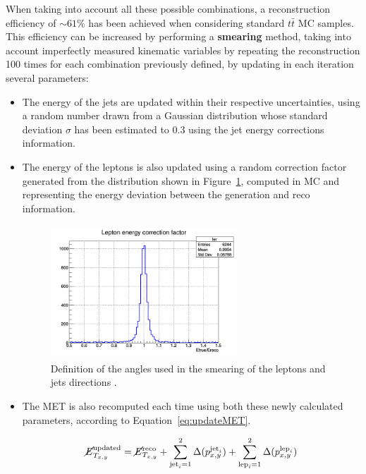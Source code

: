 \documentclass[a4paper, 10pt, openright]{report}
\begin{document}
When taking into account all these possible combinations, a reconstruction efficiency of $\sim 61$\% has been achieved when considering standard $t \bar t$ \ac{MC} samples. This efficiency can be increased by performing a \textbf{smearing} method, taking into account imperfectly measured kinematic variables by repeating the reconstruction 100 times for each combination previously defined, by updating in each iteration several parameters:
\begin{itemize}
\item The energy of the jets are updated within their respective uncertainties, using a random number drawn from a Gaussian distribution whose standard deviation $\sigma$ has been estimated to 0.3 using the jet energy corrections information.

\item The energy of the leptons is also updated using a random correction factor generated from the distribution shown in Figure~\ref{fig:lepsmearing}, computed in \ac{MC} and representing the energy deviation between the generation and reco information.

\begin{figure}[htbp]
\centering
\includegraphics[width=7cm, height=5cm]{figs/ler.png}
\caption{Definition of the angles used in the smearing of the leptons and jets directions \cite{DESYAN}.}
\label{fig:lepsmearing}
\end{figure}

\item The \ac{MET} is also recomputed each time using both these newly calculated parameters, according to Equation~\ref{eq:updateMET}.

\begin{equation}
\label{eq:updateMET}
\cancel{E}_{T_{x,y}}^{\text{updated}} = \cancel{E}_{T_{x,y}}^{\text{reco}} + \sum_{\text{jet}_i = 1}^{2} \Delta(p_{x,y}^{\text{jet}_i}) + \sum_{\text{lep}_i = 1}^{2} \Delta(p_{x,y}^{\text{lep}_i})
\end{equation}


\end{itemize}
\end{document}
